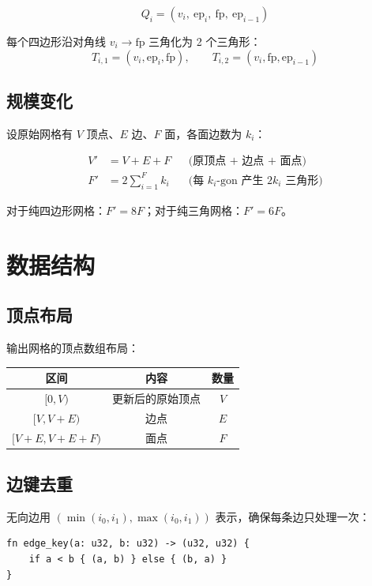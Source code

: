 \documentclass[11pt,a4paper]{article}
\begin{document}
\[
  Q_i = (v_i,\ \text{ep}_i,\ \text{fp},\ \text{ep}_{i-1})
\]

每个四边形沿对角线 $v_i \to \text{fp}$ 三角化为 2 个三角形：
\[
  T_{i,1} = (v_i, \text{ep}_i, \text{fp}), \qquad
  T_{i,2} = (v_i, \text{fp}, \text{ep}_{i-1})
\]

\subsection{规模变化}

设原始网格有 $V$ 顶点、$E$ 边、$F$ 面，各面边数为 $k_i$：

\begin{align*}
  V' &= V + E + F && \text{(原顶点 + 边点 + 面点)} \\
  F' &= 2\sum_{i=1}^{F} k_i && \text{(每 } k_i \text{-gon 产生 } 2k_i \text{ 三角形)}
\end{align*}

对于纯四边形网格：$F' = 8F$；对于纯三角网格：$F' = 6F$。

\section{数据结构}

\subsection{顶点布局}

输出网格的顶点数组布局：

\begin{center}
\begin{tabular}{@{}ccc@{}}
  \toprule
  \textbf{区间} & \textbf{内容} & \textbf{数量} \\
  \midrule
  $[0, V)$ & 更新后的原始顶点 & $V$ \\
  $[V, V+E)$ & 边点 & $E$ \\
  $[V+E, V+E+F)$ & 面点 & $F$ \\
  \bottomrule
\end{tabular}
\end{center}

\subsection{边键去重}

无向边用 $(\min(i_0, i_1), \max(i_0, i_1))$ 表示，确保每条边只处理一次：

\begin{lstlisting}
fn edge_key(a: u32, b: u32) -> (u32, u32) {
    if a < b { (a, b) } else { (b, a) }
}
\end{lstlisting}
\end{document}
